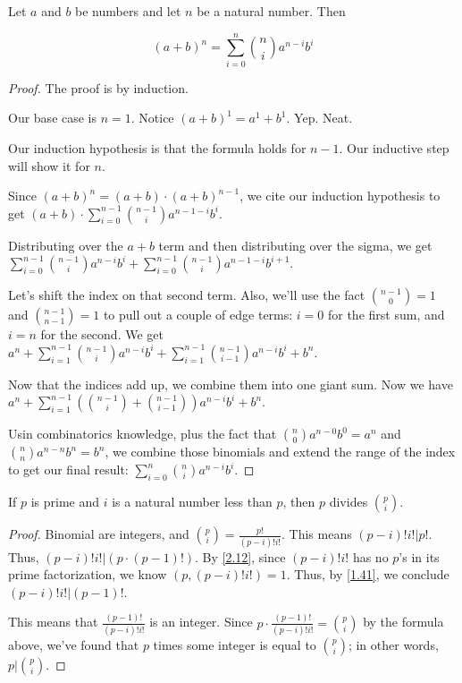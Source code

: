 \documentclass[../main.tex]{subfiles}
\begin{document}
\begin{thm} \label{4.24}
  Let $a$ and $b$ be numbers and let $n$ be a natural number. Then

  $$(a+b)^n = \sum_{i=0}^n \binom{n}{i}a^{n-i}b^i$$
\end{thm}

\begin{proof}
  The proof is by induction.

  Our base case is $n = 1$. Notice $(a+b)^1 = a^1 + b^1$. Yep. Neat.

  Our induction hypothesis is that the formula holds for $n-1$. Our inductive step will show it for $n$.

  Since $(a+b)^n = (a+b) \cdot (a+b)^{n-1}$, we cite our induction hypothesis to get $(a+b) \cdot \sum_{i=0}^{n-1} \binom{n-1}{i}a^{n-1-i}b^i$.

  Distributing over the $a+b$ term and then distributing over the sigma, we get $\sum_{i=0}^{n-1} \binom{n-1}{i}a^{n-i}b^i + \sum_{i=0}^{n-1} \binom{n-1}{i}a^{n-1-i}b^{i+1}$.

  Let's shift the index on that second term. Also, we'll use the fact $\binom{n-1}{0} = 1$ and $\binom{n-1}{n-1} = 1$ to pull out a couple of edge terms: $i = 0$ for the first sum, and $i = n$ for the second. We get $a^n + \sum_{i=1}^{n-1} \binom{n-1}{i}a^{n-i}b^i + \sum_{i=1}^{n-1} \binom{n-1}{i-1}a^{n-i}b^{i} + b^n$.

  Now that the indices add up, we combine them into one giant sum. Now we have $a^n + \sum_{i=1}^{n-1} (\binom{n-1}{i} + \binom{n-1}{i-1})a^{n-i}b^i + b^n$.

  Usin combinatorics knowledge, plus the fact that $\binom{n}{0}a^{n-0}b^0 = a^n$ and $\binom{n}{n}a^{n-n}b^n = b^n$, we combine those binomials and extend the range of the index to get our final result: $\sum_{i=0}^n \binom{n}{i}a^{n-i}b^i$.
\end{proof}



\begin{lem} \label{4.25}
  If $p$ is prime and $i$ is a natural number less than $p$, then $p$ divides $\binom{p}{i}$.
\end{lem}

\begin{proof}
  Binomial are integers, and $\binom{p}{i} = \frac{p!}{(p-i)!i!}$. This means $(p-i)!i! | p!$. Thus, $(p-i)!i! | (p \cdot (p-1)!)$. By \ref{2.12}, since $(p-i)!i!$ has no $p$'s in its prime factorization, we know $(p, (p-i)!i!) = 1$. Thus, by \ref{1.41}, we conclude $(p-i)!i! | (p-1)!$.

  This means that $\frac{(p-1)!}{(p-i)!i!}$ is an integer. Since $p \cdot \frac{(p-1)!}{(p-i)!i!} = \binom{p}{i}$ by the formula above, we've found that $p$ times some integer is equal to $\binom{p}{i}$; in other words, $p | \binom{p}{i}$.
\end{proof}
\end{document}
